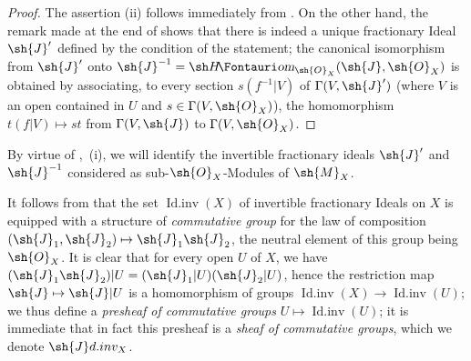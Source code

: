 \begin{proof}
The assertion (ii) follows immediately from .
On the other hand, the remark made at the end of  shows that there is indeed a unique fractionary Ideal $\sh{J}'$ defined by the condition of the statement;
the canonical isomorphism from $\sh{J}'$ onto $\sh{J}^{-1}=\shHom_{\sh{O}_X}(\sh{J},\sh{O}_X)$ is obtained by associating, to every section $s(f^{-1}|V)$ of $\Gamma(V,\sh{J}')$ (where $V$ is an open contained in $U$ and $s\in\Gamma(V,\sh{O}_X)$), the homomorphism $t(f|V)\mapsto st$ from $\Gamma(V,\sh{J})$ to $\Gamma(V,\sh{O}_X)$.
\end{proof}

By virtue of ,~(i), we will identify the invertible fractionary ideals $\sh{J}'$ and $\sh{J}^{-1}$ considered as sub-$\sh{O}_X$-Modules of $\sh{M}_X$.

\begin{env}[21.2.4]
\label{IV.21.2.4}
It follows from  that the set $\operatorname{Id.inv}(X)$ of invertible fractionary Ideals on $X$ is equipped with a structure of \emph{commutative group} for the law of composition $(\sh{J}_1,\sh{J}_2)\mapsto\sh{J}_1\sh{J}_2$, the neutral element of this group being $\sh{O}_X$.
It is clear that for every open $U$ of $X$, we have $(\sh{J}_1\sh{J}_2)|U=(\sh{J}_1|U)(\sh{J}_2|U)$, hence the restriction map $\sh{J}\mapsto\sh{J}|U$ is a homomorphism of groups $\operatorname{Id.inv}(X)\to\operatorname{Id.inv}(U)$;
we thus define a \emph{presheaf of commutative groups} $U\mapsto\operatorname{Id.inv}(U)$;
it is immediate that in fact this presheaf is a \emph{sheaf of commutative groups}, which we denote $\sh{J}d.inv_X$.
\end{env}

